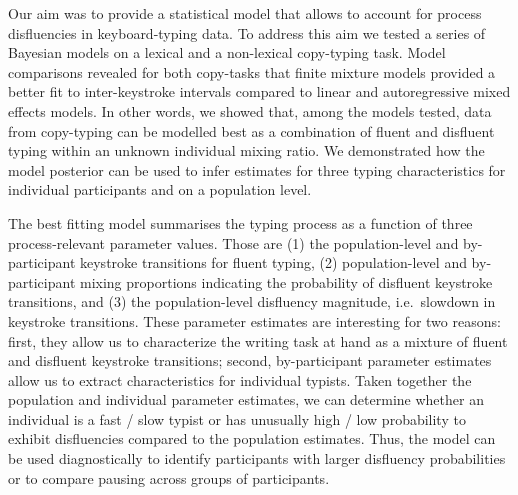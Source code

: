 \documentclass[
  english,
  man,mask,floatsintext]{apa7}
\begin{document}
Our aim was to provide a statistical model that allows to account for process disfluencies in keyboard-typing data. To address this aim we tested a series of Bayesian models on a lexical and a non-lexical copy-typing task. Model comparisons revealed for both copy-tasks that finite mixture models provided a better fit to inter-keystroke intervals compared to linear and autoregressive mixed effects models. In other words, we showed that, among the models tested, data from copy-typing can be modelled best as a combination of fluent and disfluent typing within an unknown individual mixing ratio. We demonstrated how the model posterior can be used to infer estimates for three typing characteristics for individual participants and on a population level.

The best fitting model summarises the typing process as a function of three process-relevant parameter values. Those are (1) the population-level and by-participant keystroke transitions for fluent typing, (2) population-level and by-participant mixing proportions indicating the probability of disfluent keystroke transitions, and (3) the population-level disfluency magnitude, i.e.~slowdown in keystroke transitions. These parameter estimates are interesting for two reasons: first, they allow us to characterize the writing task at hand as a mixture of fluent and disfluent keystroke transitions; second, by-participant parameter estimates allow us to extract characteristics for individual typists. Taken together the population and individual parameter estimates, we can determine whether an individual is a fast / slow typist or has unusually high / low probability to exhibit disfluencies compared to the population estimates. Thus, the model can be used diagnostically to identify participants with larger disfluency probabilities or to compare pausing across groups of participants.
\end{document}
